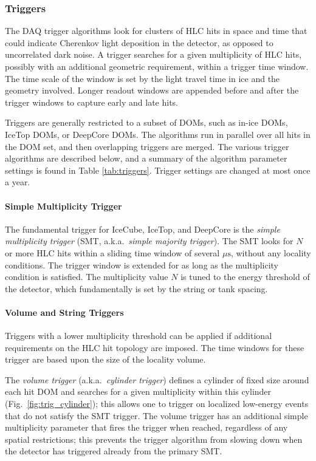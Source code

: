 \subsubsection{\label{sect:online:trigger}Triggers}

The DAQ trigger algorithms look for clusters of HLC hits in space and time
that could indicate Cherenkov light deposition in the detector, as opposed
to uncorrelated dark noise.  A trigger searches for a given multiplicity of
HLC hits, possibly with an additional geometric requirement, within a
trigger time window.  The time scale of the window is set by the light
travel time in ice and the geometry involved. Longer readout windows 
are appended before and after the trigger windows to capture early and late
hits.

Triggers are generally restricted to a subset of DOMs, such as in-ice DOMs,
IceTop DOMs, or DeepCore DOMs.  The algorithms run in parallel over all
hits in the DOM set, and then overlapping triggers are merged.   The
various trigger algorithms are described below, and a summary of the
algorithm parameter settings is found in Table \ref{tab:triggers}.  Trigger
settings are changed at most once a year.

\paragraph{Simple Multiplicity Trigger}

The fundamental trigger for IceCube, IceTop, and DeepCore is the \emph{simple
multiplicity trigger} (SMT, a.k.a.~\emph{simple majority trigger}).  The
SMT looks for $N$ or more HLC hits within a sliding time window of several
$\mu\mathrm{s}$, without any locality conditions.  The trigger window is
extended for as long as the multiplicity condition is satisfied.
The multiplicity value $N$ is tuned to the energy threshold of the
detector, which fundamentally is set by the string or tank spacing. 

\paragraph{Volume and String Triggers}

Triggers with a lower multiplicity threshold can be applied if additional requirements on the
HLC hit topology are imposed.  The time windows for these trigger are based upon the
size of the locality volume.

The \emph{volume trigger} (a.k.a.~\emph{cylinder
  trigger}) defines a cylinder of fixed size around each hit DOM and
searches for a given multiplicity within this cylinder
(Fig.~\ref{fig:trig_cylinder}); this allows one to trigger on localized
low-energy events that do not satisfy the SMT trigger.  The volume trigger
has an additional simple multiplicity parameter that fires the trigger when
reached, regardless of any spatial restrictions; this prevents the trigger
algorithm from slowing down when the detector has triggered already from
the primary SMT.

